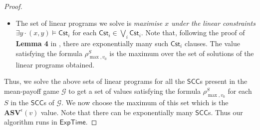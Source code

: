 \begin{proof}
\begin{enumerate}
\begin{itemize}
      \item The set of linear programs we solve is \textit{maximise $x$ under the linear constraints $\exists y \cdot (x,y) \models \mathsf{Cst}_i$} for each $\mathsf{Cst}_i \in \bigvee_i \mathsf{Cst}_i$. Note that, following the proof of \textbf{Lemma 4} in \cite{BR15}, there are exponentially many such $\mathsf{Cst}_i$ clauses. The value satisfying the formula $\rho^S_{\max,v_0}$ is the maximum over the set of solutions of the linear programs obtained.
\end{itemize}
\end{enumerate}

Thus, we solve the above sets of linear programs for all the $\mathsf{SCC}$s present in the mean-payoff game $\mathcal{G}$ to get a set of values satisfying the formula $\rho^S_{\max,v_0}$ for each $S$ in the $\mathsf{SCC}$s of $\mathcal{G}$. We now choose the maximum of this set
which is the $\mathbf{ASV}^{\epsilon}(v)$ value. Note that 
there can be exponentially many $\mathsf{SCC}$s.
Thus our algorithm runs in $\mathsf{ExpTime}$.
\end{proof}
